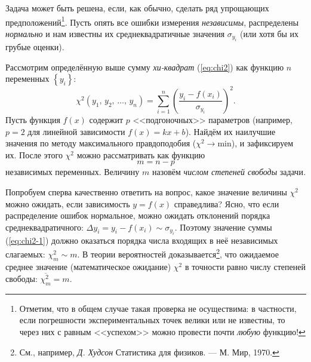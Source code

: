 \documentclass[10pt]{article}
\begin{document}
{\small{}Задача может быть решена, если, как обычно, сделать ряд упрощающих
предположений}\footnote{{\small{}Отметим, что в общем случае такая проверка не осуществима:
в частности, если погрешности экспериментальных точек велики или не
известны, то через них с равным <<успехом>>
можно провести почти }\emph{\small{}любую}{\small{} функцию!}}{\small{}. Пусть опять все ошибки измерения }\emph{\small{}независимы}{\small{},
распределены }\emph{\small{}нормально }{\small{}и нам известны их
среднеквадратичные значения $\sigma_{y_{i}}$ (или хотя бы их грубые
оценки).}{\small\par}

{\small{}Рассмотрим определённую выше сумму }\emph{\small{}хи-квадрат}{\small{}
(\ref{eq:chi2}) как функцию $n$ переменных $\left\{ y_{i}\right\} $:
\begin{equation}
\chi^{2}\!\left(y_{1},\,y_{2},\,\ldots,\,y_{n}\right)=\sum\limits _{i=1}^{n}\left(\frac{y_{i}-f\!\left(x_{i}\right)}{\sigma_{y_{i}}}\right)^{2}.\label{eq:chi2-1}
\end{equation}
Пусть функция $f\!\left(x\right)$ содержит $p$ <<подгоночных>>
параметров (например, $p=2$ для линейной зависимости $f\!\left(x\right)=kx+b$).
Найдём их наилучшие значения по методу максимального правдоподобия
($\chi^{2}\to\mathrm{min}$), и зафиксируем их. После этого $\chi^{2}$
можно рассматривать как функцию 
\[
m=n-p
\]
 независимых переменных. Величину $m$ назовём }\emph{\small{}числом
степеней свободы}{\small{} задачи}\emph{\small{}.}{\small\par}

{\small{}Попробуем сперва качественно ответить на вопрос, какое значение
величины $\chi^{2}$ можно ожидать, если зависимость $y=f\!\left(x\right)$
справедлива? Ясно, что если распределение ошибок нормальное, можно
ожидать отклонений порядка среднеквадратичного: $\Delta y_{i}=y_{i}-f\!\left(x_{i}\right)\sim\sigma_{y_{i}}$.
Поэтому значение суммы (\ref{eq:chi2-1}) должно оказаться порядка
числа входящих в неё независимых слагаемых: $\chi_{m}^{2}\sim m$.
В теории вероятностей доказывается}\footnote{См., например, \emph{Д. Худсон} Статистика для физиков. ---
М. Мир, 1970.}{\small{}, что ожидаемое среднее значение (математическое ожидание)
$\chi^{2}$ в точности равно числу степеней свободы: $\overline{\chi_{m}^{2}}=m$.}{\small\par}
\end{document}
